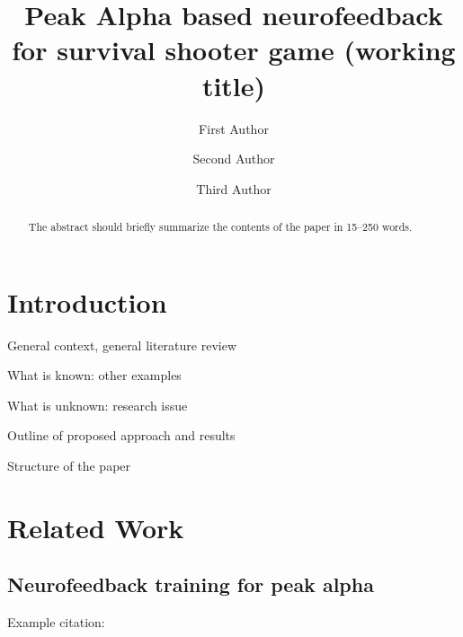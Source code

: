 \documentclass[runningheads]{llncs}
\begin{document}
%
\title{Peak Alpha based neurofeedback for survival shooter game (working title)}
%
%
\author{First Author \and
Second Author \and
Third Author}
%
%
%
\maketitle              %
%
\begin{abstract}
The abstract should briefly summarize the contents of the paper in
15--250 words.

\end{abstract}
%
%
%
\section{Introduction}

General context, general literature review

What is known: other examples

What is unknown: research issue

Outline of proposed approach and results

Structure of the paper


\section{Related Work}
\subsection{ Neurofeedback training for peak alpha }
Example citation:
\cite{hsueh2016neurofeedback}
\cite{gruzelier2014eeg}
\cite{kosunen2016relaworld}
\cite{kober2015specific} 
\cite{jurewicz2018eeg}
\cite{pacheco2016neurofeedback}
\cite{ghasemian2016effect}
\cite{marzbani2016neurofeedback}
\cite{zhigalov2016modulation}
\cite{lackner2016eeg}
\cite{escolano2014controlled}
\cite{davelaar2017mechanisms}
\cite{bazanova2018efficiency}
\cite{mierau2016interrelation}
\cite{arns2015neurofeedback}
\end{document}
